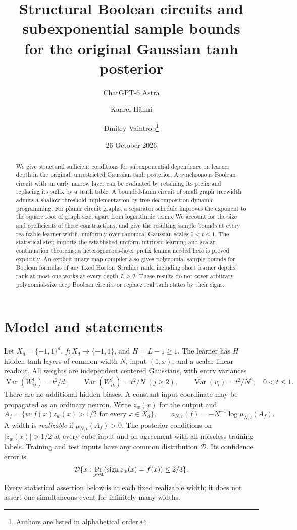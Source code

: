 \documentclass[11pt]{article}
\title{Structural Boolean circuits and subexponential sample bounds\\for the original Gaussian tanh posterior}
\author{ChatGPT-6 Astra \and Kaarel H\"anni \and Dmitry Vaintrob\thanks{Authors are listed in alphabetical order.}}
\date{26 October 2026}
\theoremstyle{remark}\newtheorem{remark}[theorem]{Remark}
\begin{document}
\maketitle
\begin{abstract}
We give structural sufficient conditions for subexponential dependence
on learner depth in the original, unrestricted Gaussian tanh posterior.
A synchronous Boolean circuit with an early narrow layer can be evaluated
by retaining its prefix and replacing its suffix by a truth table. A
bounded-fanin circuit of small graph treewidth admits a shallow threshold
implementation by tree-decomposition dynamic programming. For planar
circuit graphs, a separator schedule improves the exponent to the square
root of graph size, apart from logarithmic terms. We account for
the size and coefficients of these constructions, and give the resulting
sample bounds at every realizable learner width, uniformly over canonical
Gaussian scales $0<t\le1$. The statistical step imports the established
uniform intrinsic-learning and scalar-continuation theorems; a
heterogeneous-layer prefix lemma needed here is proved explicitly.
An explicit unary-map compiler also gives polynomial sample bounds
for Boolean formulas of any fixed Horton--Strahler rank, including
short learner depths; rank at most one works at every depth $L\ge2$.
These results do not cover arbitrary polynomial-size deep Boolean circuits
or replace real tanh states by their signs.
\end{abstract}

\section{Model and statements}
Let $X_d=\{-1,1\}^d$, $f:X_d\to\{-1,1\}$, and $H=L-1\ge1$.
The learner has $H$ hidden tanh layers of common width $N$, input
$(1,x)$, and a scalar linear readout. All weights are independent
centered Gaussians, with entry variances
\[
 \operatorname{Var}(W^1_{ij})=t^2/d,\qquad
 \operatorname{Var}(W^j_{ik})=t^2/N\ (j\ge2),\qquad
 \operatorname{Var}(v_i)=t^2/N^2,
 \quad 0<t\le1.
\]
There are no additional hidden biases. A constant input coordinate may
be propagated as an ordinary neuron. Write $z_w(x)$ for the output and
\[
 A_f=\{w:f(x)z_w(x)>1/2\text{ for every }x\in X_d\},\qquad
 a_{N,t}(f)=-N^{-1}\log\mu_{N,t}(A_f).
\]
A width is \emph{realizable} if $\mu_{N,t}(A_f)>0$. The posterior
conditions on $|z_w(x)|>1/2$ at every cube input and on agreement with
all noiseless training labels. Training and test inputs have any common
distribution $\mathcal D$. Its confidence error is
\[
 \mathcal D\{x:\Pr_{\rm post}(\operatorname{sign}z_w(x)=f(x))\le2/3\}.
\]
Every statistical assertion below is at each fixed realizable width;
it does not assert one simultaneous event for infinitely many widths.
\end{document}
